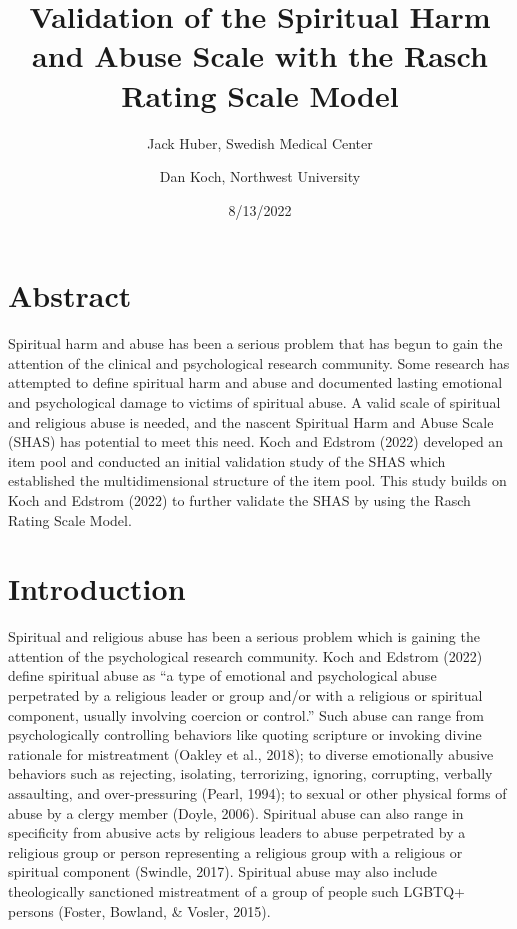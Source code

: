 \documentclass[
  letterpaper,
  DIV=11,
  numbers=noendperiod]{scrreport}
\title{Validation of the Spiritual Harm and Abuse Scale with the Rasch
Rating Scale Model}
\author{Jack Huber, Swedish Medical Center \and Dan Koch, Northwest
University}
\date{8/13/2022}
\renewcommand*\contentsname{Table of contents}
\newcommand\contentsname{Table of contents}
\begin{document}
\maketitle
\ifdefined\Shaded\renewenvironment{Shaded}{\begin{tcolorbox}[interior hidden, boxrule=0pt, frame hidden, sharp corners, breakable, enhanced, borderline west={3pt}{0pt}{shadecolor}]}{\end{tcolorbox}}\fi

\renewcommand*\contentsname{Table of contents}
{
\hypersetup{linkcolor=}
\setcounter{tocdepth}{2}
\tableofcontents
}

\hypertarget{abstract}{%
\chapter*{Abstract}\label{abstract}}

Spiritual harm and abuse has been a serious problem that has begun to
gain the attention of the clinical and psychological research community.
Some research has attempted to define spiritual harm and abuse and
documented lasting emotional and psychological damage to victims of
spiritual abuse. A valid scale of spiritual and religious abuse is
needed, and the nascent Spiritual Harm and Abuse Scale (SHAS) has
potential to meet this need. Koch and Edstrom (2022) developed an item
pool and conducted an initial validation study of the SHAS which
established the multidimensional structure of the item pool. This study
builds on Koch and Edstrom (2022) to further validate the SHAS by using
the Rasch Rating Scale Model.


\hypertarget{introduction}{%
\chapter*{Introduction}\label{introduction}}

Spiritual and religious abuse has been a serious problem which is
gaining the attention of the psychological research community. Koch and
Edstrom (2022) define spiritual abuse as ``a type of emotional and
psychological abuse perpetrated by a religious leader or group and/or
with a religious or spiritual component, usually involving coercion or
control.'' Such abuse can range from psychologically controlling
behaviors like quoting scripture or invoking divine rationale for
mistreatment (Oakley et al., 2018); to diverse emotionally abusive
behaviors such as rejecting, isolating, terrorizing, ignoring,
corrupting, verbally assaulting, and over-pressuring (Pearl, 1994); to
sexual or other physical forms of abuse by a clergy member (Doyle,
2006). Spiritual abuse can also range in specificity from abusive acts
by religious leaders to abuse perpetrated by a religious group or person
representing a religious group with a religious or spiritual component
(Swindle, 2017). Spiritual abuse may also include theologically
sanctioned mistreatment of a group of people such LGBTQ+ persons
(Foster, Bowland, \& Vosler, 2015).
\end{document}
